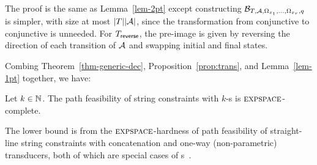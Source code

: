 The proof is the same as Lemma~\ref{lem-2pt} except constructing $\mathcal{B}_{T, \mathcal{A}, \Omega_{x_1}, \ldots, \Omega_{x_r}, q}$ is simpler, with size at most $|T| |\mathcal{A}|$, since the transformation from  conjunctive \FFA{} to conjunctive \FA{} is unneeded. For $T_{\sf reverse}$, the pre-image is given by reversing the direction of each transition of $\mathcal{A}$ and swapping initial and final states.   

Combing Theorem~\ref{thm-generic-dec}, Proposition~\ref{prop:trans}, and Lemma~\ref{lem-1pt} together, we have:

\begin{theorem} \label{thm-rb-2pt}
Let  $k \in \mathbb{N}$. The path feasibility of string constraints with $k$-\RBPPT{}s is $\textsc{expspace}$-complete. 
\end{theorem}

The lower bound is from the $\textsc{expspace}$-hardness of path feasibility of straight-line string constraints with concatenation and one-way (non-parametric) transducers,  both of which are special cases of \PT{}s~\cite{LB16}.
